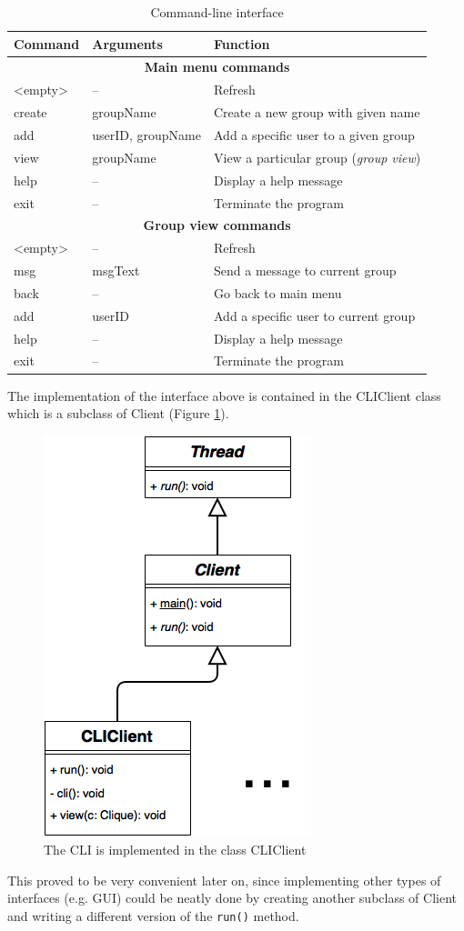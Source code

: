 \documentclass[a4paper, 12pt]{report}
\begin{document}
\begin{table}[H]
\centering
\begin{tabular*}{0.9\textwidth}{l | l | l}
    Command & Arguments & Function \\
    \hline
    \multicolumn{3}{c}{\textbf{Main menu commands}} \\
    \hline
    <empty> & -- & Refresh \\
    create & groupName & Create a new group with given name \\
    add & userID, groupName & Add a specific user to a given group \\
    view & groupName & View a particular group (\emph{group view}) \\
    help & -- & Display a help message \\
    exit & -- & Terminate the program \\
    \hline
    \multicolumn{3}{c}{\textbf{Group view commands}} \\
    \hline 
    <empty> & -- & Refresh \\
    msg & msgText & Send a message to current group \\
    back & -- & Go back to main menu \\
    add & userID & Add a specific user to current group \\
    help & -- & Display a help message \\
    exit & -- & Terminate the program \\ 
\end{tabular*}
\caption{\label{tab:CLI} Command-line interface}
\end{table}
The implementation of the interface above is contained in the CLIClient class which is a subclass of Client (Figure \ref{fig:CLIClient_uml}).
\begin{figure}[H]
\centering
\includegraphics[width = 0.31 \linewidth]{pics/CLIClient_uml.png}
\caption{\label{fig:CLIClient_uml} The CLI is implemented in the class CLIClient}
\end{figure}
This proved to be very convenient later on, since implementing other types of interfaces (e.g. GUI) could be neatly done by creating another subclass of Client and writing a different version of the \texttt{run()} method.
\end{document}
